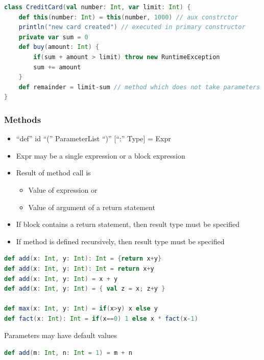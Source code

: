 \begin{lstlisting}[language=scala]
class CreditCard(val number: Int, var limit: Int) {
    def this(number: Int) = this(number, 1000) // aux constrctor
    println("new card created") // executed in primary constructor
    private var sum = 0
    def buy(amount: Int) {
        if(sum + amount > limit) throw new RuntimeException
        sum += amount
    }
    def remainder = limit-sum // method which does not take parameters
}
\end{lstlisting}

\hypertarget{methods}{%
\subsubsection{Methods}\label{methods}}

\begin{itemize}
\tightlist
\item
  ``def'' id ``('' ParameterList ``)'' {[}``:'' Type{]} = Expr
\item
  Expr may be a single expression or a block expression
\item
  Result of method call is

  \begin{itemize}
  \tightlist
  \item
    Value of expression or
  \item
    Value of argument of a return statement
  \end{itemize}
\item
  If block contains a return statement, then result type must be
  specified
\item
  If method is defined recursively, then result type must be specified
\end{itemize}

\begin{lstlisting}[language=scala]
def add(x: Int, y: Int): Int = {return x+y}
def add(x: Int, y: Int): Int = return x+y
def add(x: Int, y: Int) = x + y
def add(x: Int, y: Int) = { val z = x; z+y }

def max(x: Int, y: Int) = if(x>y) x else y
def fact(x: Int): Int = if(x==0) 1 else x * fact(x-1)
\end{lstlisting}

Parameters may have default values

\begin{lstlisting}[language=scala]
def add(m: Int, n: Int = 1) = m + n
\end{lstlisting}

